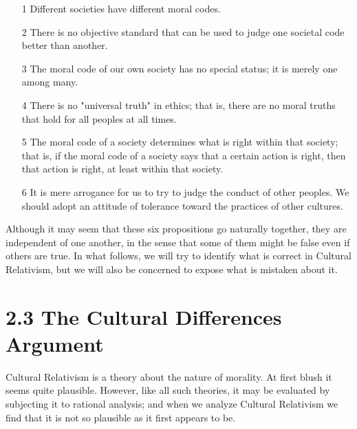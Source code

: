 \begin{enumerate}
\item[1] Different societies have different moral codes.
\item[2] There  is  no  objective  standard  that  can  be  used  to  judge 
one societal code better than another.
\item[3] The moral code of our own society has no special status; it 
is merely one among many. 
\item[4] There  is no "universal truth"  in ethics; that  is, there are no 
moral truths that hold for all peoples at all times. 
\item[5] The moral code of a society determines what is right within 
that society; that is, if the moral code of a society says that 
a  certain  action  is  right,  then  that  action  is  right,  at  least 
within that society. 
\item[6] It  is  mere  arrogance  for  us  to  try  to  judge  the  conduct  of 
other  peoples.  We  should  adopt  an  attitude  of  tolerance 
toward the practices of other cultures.
\end{enumerate}

Although  it  may  seem  that  these  six  propositions  go  naturally  together, 
they  are  independent  of  one  another,  in  the  sense  that  some  of  them 
might  be  false  even  if  others  are  true.  In  what  follows,  we  will  try  to 
identify what  is  correct in Cultural Relativism, but  we will  also be 
concerned to expose what is mistaken about it.

\section{2.3 The Cultural Differences Argument} 
Cultural Relativism is a theory about the nature of morality. At first blush 
it  seems  quite  plausible.  However,  like  all  such  theories,  it  may  be 
evaluated  by  subjecting  it  to  rational  analysis;  and  when  we  analyze 
Cultural Relativism we find that it is not so plausible as it first appears to 
be. 

